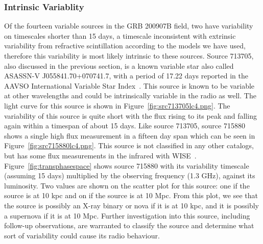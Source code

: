 \documentclass[12pt]{article}
\begin{document}
\subsubsection{Intrinsic Variablity}
Of the fourteen variable sources in the GRB 200907B field, two have variability on timescales shorter than 15 days, a timescale inconsistent with extrinsic variability from refractive scintillation according to the models we have used, therefore this variability is most likely intrinsic to these sources. Source 713705, also discussed in the previous section, is a known variable star also called ASASSN-V J055841.70+070741.7, with a period of 17.22 days reported in the AAVSO International Variable Star Index~\citep{2006SASS...25...47W}. This source is known to be variable at other wavelengths and could be intrinsically variable in the radio as well. The light curve for this source is shown in Figure~\ref{fig:src713705lc4.png}. The variability of this source is quite short with the flux rising to its peak and falling again within a timespan of about 15 days. Like source 713705, source 715880 shows a single high flux measurement in a fifteen day span which can be seen in Figure~\ref{fig:src715880lc4.png}. This source is not classified in any other catalogs, but has some flux measurements in the infrared with WISE~\citep{2014yCat.2328....0C}. Figure~\ref{fig:transphasespace} shows source 715880 with its variability timescale (assuming 15 days) multiplied by the observing frequency (1.3 GHz), against its luminosity. Two values are shown on the scatter plot for this source: one if the source is at 10 kpc and on if the source is at 10 Mpc. From this plot, we see that the source is possibly an X-ray binary or nova if it is at 10 kpc, and it is possibly a supernova if it is at 10 Mpc. Further investigation into this source, including follow-up observations, are warranted to classify the source and determine what sort of variability could cause its radio behaviour.
\end{document}
